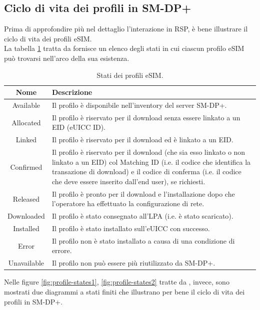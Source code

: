 \documentclass[10pt, oneside]{book}
\begin{document}
\subsection{Ciclo di vita dei profili in SM-DP+}
Prima di approfondire più nel dettaglio l'interazione in RSP, è bene illustrare il ciclo di vita dei profili eSIM.\\
La tabella \ref{tab:profile-states} tratta da \cite{GSMA-docs-new}\cite{GSMA-docs-old} fornisce un elenco degli stati in cui ciascun profilo eSIM può trovarsi nell'arco della sua esistenza.
\begin{table}[h!]
\begin{center}
\captionsetup{skip=4pt}
\caption{Stati dei profili eSIM.}
\label{tab:profile-states}
\begin{tabularx}{\textwidth}{|c|X|}
\hline
\textbf{Nome} & \textbf{Descrizione}\\
\hline
Available & Il profilo è disponibile nell’inventory del server SM-DP+.\\
\hline
Allocated & Il profilo è riservato per il download senza essere linkato a un EID (eUICC ID).\\
\hline
Linked & Il profilo è riservato per il download ed è linkato a un EID.\\
\hline
Confirmed & Il profilo è riservato per il download (che sia esso linkato o non linkato a un EID) col Matching ID (i.e. il codice che identifica la transazione di download) e il codice di conferma (i.e. il codice che deve essere inserito dall'end user), se richiesti.\\
\hline
Released & Il profilo è pronto per il download e l’installazione dopo che l’operatore ha effettuato la configurazione di rete.\\
\hline
Downloaded & Il profilo è stato consegnato all’LPA (i.e. è stato scaricato).\\
\hline
Installed & Il profilo è stato installato sull’eUICC con successo.\\
\hline
Error & Il profilo non è stato installato a causa di una condizione di errore.\\
\hline
Unavailable & Il profilo non può essere più riutilizzato da SM-DP+.\\
\hline
\end{tabularx}
\end{center}
\end{table}
Nelle figure \ref{fig:profile-states1}, \ref{fig:profile-states2} tratte da \cite{GSMA-docs-new}\cite{GSMA-docs-old}, invece, sono mostrati due diagrammi a stati finiti che illustrano per bene il ciclo di vita dei profili in SM-DP+.
\end{document}
